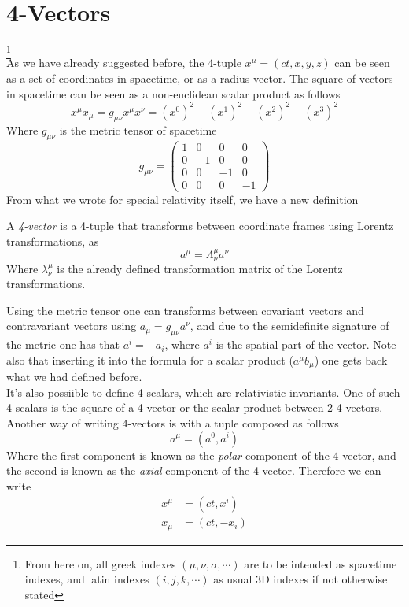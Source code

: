\documentclass[../admech.tex]{subfiles}
\begin{document}
\section{4-Vectors}
\footnote{From here on, all greek indexes $(\mu,\nu,\sigma,\cdots)$ are to be intended as spacetime indexes, and latin indexes $(i,j,k,\cdots)$ as usual 3D indexes if not otherwise stated}\\
As we have already suggested before, the 4-tuple $x^\mu=(ct,x,y,z)$ can be seen as a set of coordinates in spacetime, or as a radius vector. The square of vectors in spacetime can be seen as a non-euclidean scalar product as follows
\begin{equation}
	x^\mu x_\mu=g_{\mu\nu}x^\mu x^\nu=(x^0)^2-(x^1)^2-(x^2)^2-(x^3)^2
	\label{eq:scalprod}
\end{equation}
Where $g_{\mu\nu}$ is the metric tensor of spacetime
\begin{equation}
	g_{\mu\nu}=\begin{pmatrix}
		1&0&0&0\\
		0&-1&0&0\\
		0&0&-1&0\\
		0&0&0&-1
	\end{pmatrix}
	\label{eq:metrictensorst}
\end{equation}
From what we wrote for special relativity itself, we have a new definition
\begin{dfn}[4-Vector]
	A \emph{4-vector} is a 4-tuple that transforms between coordinate frames using Lorentz transformations, as
	\begin{equation}
		a^\mu=\Lambda^\mu_\nu a^\nu
		\label{eq:lortran4vec}
	\end{equation}
	Where $\lambda^\mu_\nu$ is the already defined transformation matrix of the Lorentz transformations.\\
\end{dfn}
Using the metric tensor one can transforms between covariant vectors and contravariant vectors using $a_\mu=g_{\mu\nu}a^\nu$, and due to the semidefinite signature of the metric one has that $a^i=-a_i$, where $a^i$ is the spatial part of the vector. Note also that inserting it into the formula for a scalar product ($a^\mu b_\mu$) one gets back what we had defined before.\\
It's also possiible to define 4-scalars, which are relativistic invariants. One of such 4-scalars is the square of a 4-vector or the scalar product between 2 4-vectors.\\
Another way of writing 4-vectors is with a tuple composed as follows
\begin{equation}
	a^\mu=(a^0,a^i)
	\label{eq:polaraxial}
\end{equation}
Where the first component is known as the \emph{polar} component of the 4-vector, and the second is known as the \emph{axial} component of the 4-vector. Therefore we can write
\begin{equation}
	\begin{aligned}
		x^\mu&=(ct,x^i)\\
		x_\mu&=(ct,-x_i)
	\end{aligned}
	\label{eq:4coord}
\end{equation}
\end{document}
